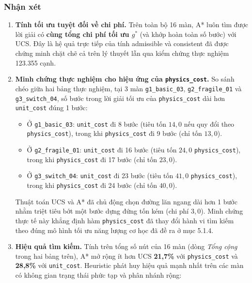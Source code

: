 \subsubsection{Nhận xét}

\begin{enumerate}
\item \textbf{Tính tối ưu tuyệt đối về chi phí.} Trên toàn bộ 16 màn, A* luôn tìm được lời giải có \textbf{cùng tổng chi phí tối ưu $g^*$} (và khớp hoàn toàn số bước) với UCS. Đây là hệ quả trực tiếp của tính admissible và consistent đã được chứng minh chặt chẽ cả trên lý thuyết lẫn qua kiểm chứng thực nghiệm 123.355 cạnh.
\item \textbf{Minh chứng thực nghiệm cho hiệu ứng của \texttt{physics\_\allowbreak{}cost}.} So sánh chéo giữa hai bảng thực nghiệm, tại 3 màn \texttt{g1\_\allowbreak{}basic\_\allowbreak{}03}, \texttt{g2\_\allowbreak{}fragile\_\allowbreak{}01} và \texttt{g3\_\allowbreak{}switch\_\allowbreak{}04}, số bước trong lời giải tối ưu của \texttt{physics\_\allowbreak{}cost} dài hơn \texttt{unit\_\allowbreak{}cost} đúng 1 bước:
\begin{itemize}
\item Ở \texttt{g1\_\allowbreak{}basic\_\allowbreak{}03}: \texttt{unit\_\allowbreak{}cost} đi 8 bước (tiêu tốn $14{,}0$ nếu quy đổi theo \texttt{physics\_\allowbreak{}cost}), trong khi \texttt{physics\_\allowbreak{}cost} đi 9 bước (chỉ tốn $13{,}0$).
\item Ở \texttt{g2\_\allowbreak{}fragile\_\allowbreak{}01}: \texttt{unit\_\allowbreak{}cost} đi 16 bước (tiêu tốn $24{,}0$ \texttt{physics\_\allowbreak{}cost}), trong khi \texttt{physics\_\allowbreak{}cost} đi 17 bước (chỉ tốn $23{,}0$).
\item Ở \texttt{g3\_\allowbreak{}switch\_\allowbreak{}04}: \texttt{unit\_\allowbreak{}cost} đi 23 bước (tiêu tốn $41{,}0$ \texttt{physics\_\allowbreak{}cost}), trong khi \texttt{physics\_\allowbreak{}cost} đi 24 bước (chỉ tốn $40{,}0$).
\end{itemize}
Thuật toán UCS và A* đã chủ động chọn đường lăn ngang dài hơn 1 bước nhằm triệt tiêu bớt một bước dựng đứng tốn kém (chi phí $3{,}0$). Minh chứng thực tế này khẳng định hàm \texttt{physics\_\allowbreak{}cost} đã thay đổi hành vi tìm kiếm theo đúng mô hình tối ưu năng lượng cơ học đã đề ra ở mục 5.1.4.
\item \textbf{Hiệu quả tìm kiếm.} Tính trên tổng số nút của 16 màn (dòng \emph{Tổng cộng} trong hai bảng trên), A* mở rộng ít hơn UCS \textbf{21,7\%} với \texttt{physics\_\allowbreak{}cost} và \textbf{28,8\%} với \texttt{unit\_\allowbreak{}cost}. Heuristic phát huy hiệu quả mạnh nhất trên các màn có không gian trạng thái phức tạp và phân nhánh rộng:

\end{enumerate}

